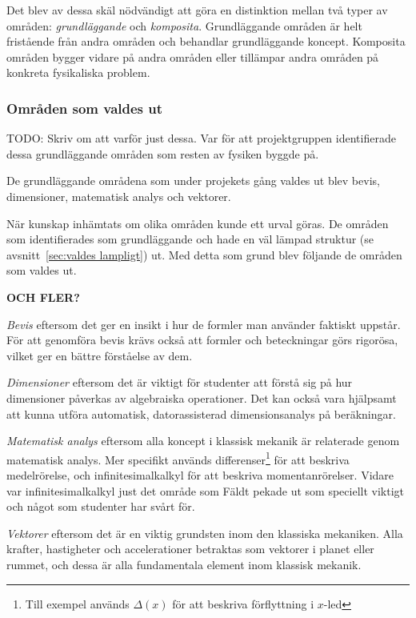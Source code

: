 \begin{draft}
Det blev av dessa skäl nödvändigt att göra en distinktion mellan två typer av
områden: \textit{grundläggande} och \textit{komposita}. Grundläggande områden är
helt fristående från andra områden och behandlar grundläggande koncept.
Komposita områden bygger vidare på andra områden eller tillämpar andra områden
på konkreta fysikaliska problem.

\subsubsection{Områden som valdes ut}

TODO: Skriv om att varför just dessa. Var för att projektgruppen identifierade
dessa grundläggande områden som resten av fysiken byggde på.

De grundläggande områdena som under projekets gång valdes ut blev bevis,
dimensioner, matematisk analys och vektorer.

När kunskap inhämtats om olika områden kunde ett urval göras. De områden som
identifierades som grundläggande och hade en väl lämpad struktur (se
avsnitt~\ref{sec:valdes lampligt}) ut. Med detta som grund blev följande de
områden som valdes ut.

\textbf{OCH FLER?}

\textit{Bevis} eftersom det ger en insikt i hur de formler man använder
faktiskt uppstår. För att genomföra bevis krävs också att formler och
beteckningar görs rigorösa, vilket ger en bättre förståelse av dem.

\textit{Dimensioner} eftersom det är viktigt för studenter att förstå sig på
hur dimensioner påverkas av algebraiska operationer. Det kan också vara
hjälpsamt att kunna utföra automatisk, datorassisterad dimensionsanalys på
beräkningar.

\textit{Matematisk analys} eftersom alla koncept i klassisk mekanik är
relaterade genom matematisk analys. Mer specifikt används
differenser\footnote{Till exempel används $\Delta(x)$ för att beskriva
förflyttning i $x$-led} för att beskriva medelrörelse, och infinitesimalkalkyl
för att beskriva momentanrörelser. Vidare var infinitesimalkalkyl just det
område som Fäldt pekade ut som speciellt viktigt och något som studenter har
svårt för.

\textit{Vektorer} eftersom det är en viktig grundsten inom den klassiska
mekaniken. Alla krafter, hastigheter och accelerationer betraktas som vektorer i
planet eller rummet, och dessa är alla fundamentala element inom klassisk
mekanik.

\end{draft}
